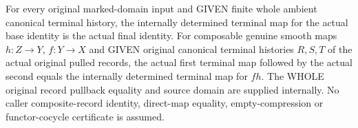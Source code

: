 \begin{theorem}
\label{hir:smooth-original-finite-terminal-map-identity-composition}
\leanok
{}
For every original marked-domain input and GIVEN finite whole ambient
canonical terminal history, the internally determined terminal map for
the actual base identity is the actual final identity. For composable
genuine smooth maps $h:Z\to Y$, $f:Y\to X$ and GIVEN original canonical
terminal histories $R,S,T$ of the actual original pulled records, the
actual first terminal map followed by the actual second equals the
internally determined terminal map for $fh$. The WHOLE original record
pullback equality and source domain are supplied internally. No caller
composite-record identity, direct-map equality, empty-compression or
functor-cocycle certificate is assumed.
\end{theorem}

